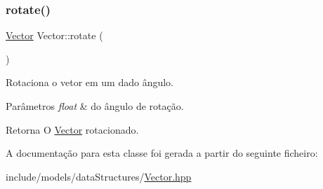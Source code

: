 \subsubsection{\texorpdfstring{rotate()}{rotate()}}
{\footnotesize\ttfamily \hyperlink{classVector}{Vector} Vector\+::rotate (\begin{DoxyParamCaption}\item[{float}]{ }\end{DoxyParamCaption})}

Rotaciona o vetor em um dado ângulo. 
\begin{DoxyParams}{Parâmetros}
{\em float} & do ângulo de rotação. \\
\hline
\end{DoxyParams}
\begin{DoxyReturn}{Retorna}
O \hyperlink{classVector}{Vector} rotacionado. 
\end{DoxyReturn}


A documentação para esta classe foi gerada a partir do seguinte ficheiro\+:\begin{DoxyCompactItemize}
\item 
include/models/data\+Structures/\hyperlink{Vector_8hpp}{Vector.\+hpp}\end{DoxyCompactItemize}
